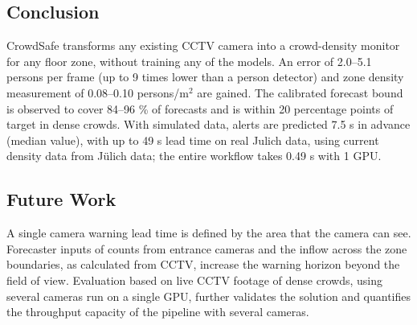 \documentclass[conference]{IEEEtran}
\newcommand{\pmsq}{persons/m$^2$}
\begin{document}
\subsection{Conclusion}
CrowdSafe transforms any existing CCTV camera into a crowd-density monitor for any floor zone, without training any of the models. An error of 2.0--5.1 persons per frame (up to 9 times lower than a person detector) and zone density measurement of 0.08--0.10 \pmsq{} are gained. The calibrated forecast bound is observed to cover 84--96 \% of forecasts and is within 20 percentage points of target in dense crowds. With simulated data, alerts are predicted 7.5 s in advance (median value), with up to 49 s lead time on real Julich data, using current density data from J\"ulich data; the entire workflow takes 0.49 s with 1 GPU.

\subsection{Future Work}
A single camera warning lead time is defined by the area that the camera can see. Forecaster inputs of counts from entrance cameras and the inflow across the zone boundaries, as calculated from CCTV, increase the warning horizon beyond the field of view. Evaluation based on live CCTV footage of dense crowds, using several cameras run on a single GPU, further validates the solution and quantifies the throughput capacity of the pipeline with several cameras.
\end{document}
